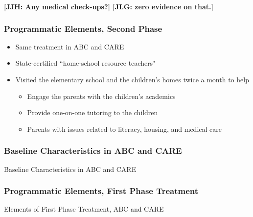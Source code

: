 \documentclass[static]{JJH-Beamer}
\begin{document}
\textbf{[JJH: Any medical check-ups?] [JLG: zero evidence on that.]}
\clearpage
\begin{frame}
\frametitle{Programmatic Elements, Second Phase}\label{elements}

\begin{itemize}	
\item Same treatment in ABC and CARE
\item State-certified ``home-school resource teachers"
\item Visited the elementary school and the children's homes twice a month to help
	\begin{itemize}
	\item Engage the parents with the children's academics
	\item Provide one-on-one tutoring to the children
	\item Parents with issues related to literacy, housing, and medical care
	\end{itemize}
\end{itemize}

\end{frame}

\begin{frame}
\frametitle{Baseline Characteristics in ABC and CARE}\label{baseline_abccare}

\begin{table}[H]
\caption{Baseline Characteristics in ABC and CARE}
\begin{center}
\end{center}
\end{table}

\end{frame}

\begin{frame}
\frametitle{Programmatic Elements, First Phase Treatment}\label{first_phase}
	
\begin{table}[H]
\caption{Elements of First Phase Treatment, ABC and CARE}
\begin{center}
\end{center}
\end{table}

\end{frame}
\end{document}
